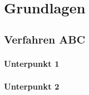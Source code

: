 \chapter{Grundlagen}

\section{Verfahren ABC}

\blindtext

\subsection{Unterpunkt 1}
\blindtext
\TXExample{\blindtext}


\subsection{Unterpunkt 2}
\blindtext

